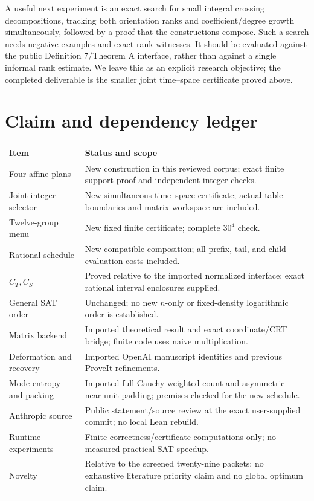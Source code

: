 \documentclass[11pt]{article}
\theoremstyle{definition}\newtheorem{definition}[theorem]{Definition}
\theoremstyle{remark}\newtheorem{remark}[theorem]{Remark}
\begin{document}
A useful next experiment is an exact search for small integral crossing
decompositions, tracking both orientation ranks and coefficient/degree
growth simultaneously, followed by a proof that the constructions compose.
Such a search needs negative examples and exact rank witnesses. It should
be evaluated against the public Definition 7/Theorem A interface, rather
than against a single informal rank estimate. We leave this as an explicit
research objective; the completed deliverable is the smaller joint
time--space certificate proved above.

\appendix
\section{Claim and dependency ledger}

\begin{longtable}{p{4.1cm}p{9.9cm}}
\toprule Item & Status and scope\\\midrule\endhead
Four affine plans & New construction in this reviewed corpus; exact finite
support proof and independent integer checks.\\
Joint integer selector & New simultaneous time--space certificate; actual
table boundaries and matrix workspace are included.\\
Twelve-group menu & New fixed finite certificate; complete $30^4$ check.\\
Rational schedule & New compatible composition; all prefix, tail, and child
evaluation costs included.\\
$C_T,C_S$ & Proved relative to the imported normalized interface; exact
rational interval enclosures supplied.\\
General SAT order & Unchanged; no new $n$-only or fixed-density logarithmic
order is established.\\
Matrix backend & Imported theoretical result and exact coordinate/CRT
bridge; finite code uses naive multiplication.\\
Deformation and recovery & Imported OpenAI manuscript identities and
previous ProveIt refinements.\\
Mode entropy and packing & Imported full-Cauchy weighted count and
asymmetric near-unit padding; premises checked for the new schedule.\\
Anthropic source & Public statement/source review at the exact user-supplied
commit; no local Lean rebuild.\\
Runtime experiments & Finite correctness/certificate computations only;
no measured practical SAT speedup.\\
Novelty & Relative to the screened twenty-nine packets; no exhaustive
literature priority claim and no global optimum claim.\\\bottomrule
\end{longtable}
\end{document}
